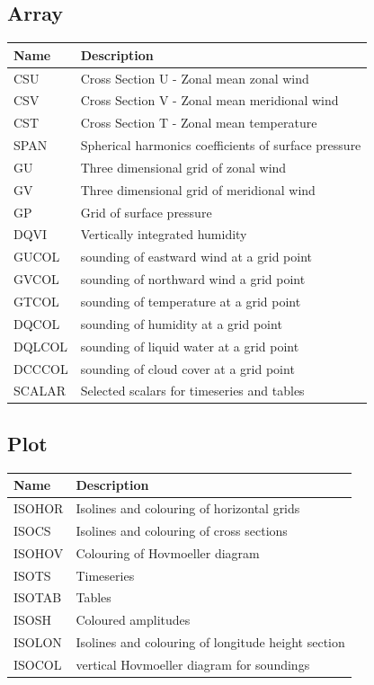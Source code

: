 \subsection{Array}
\begin{tabular}{|l|l|}
\hline
Name     & Description \\
\hline
CSU      & Cross Section U - Zonal mean zonal wind \\
CSV      & Cross Section V - Zonal mean meridional wind \\
CST      & Cross Section T - Zonal mean temperature \\
SPAN     & Spherical harmonics coefficients of surface pressure \\
GU       & Three dimensional grid of zonal wind \\
GV       & Three dimensional grid of meridional wind \\
GP       & Grid of surface pressure \\
DQVI     & Vertically integrated humidity \\
GUCOL    & sounding of eastward wind at a grid point \\
GVCOL    & sounding of northward wind a grid point \\
GTCOL    & sounding of temperature at a grid point \\
DQCOL    & sounding of humidity at a grid point \\
DQLCOL   & sounding of liquid water at a grid point \\
DCCCOL   & sounding of cloud cover at a grid point \\
SCALAR   & Selected scalars for timeseries and tables \\
\hline
\end{tabular}

\subsection{Plot}
\begin{tabular}{|l|l|}
\hline
Name     & Description \\
\hline
   ISOHOR & Isolines and colouring of horizontal grids \\
   ISOCS &  Isolines and colouring of cross sections \\
   ISOHOV & Colouring of Hovmoeller diagram \\
   ISOTS &  Timeseries \\
   ISOTAB & Tables \\
   ISOSH &  Coloured amplitudes \\
   ISOLON & Isolines and colouring of longitude height section \\
   ISOCOL & vertical Hovmoeller diagram for soundings \\
\hline
\end{tabular}

